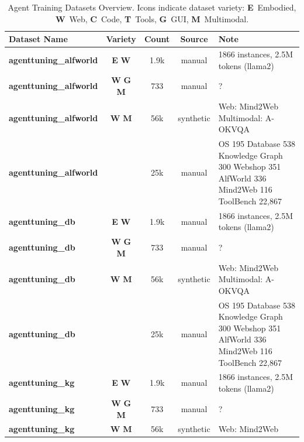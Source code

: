 \begin{table}[t]
    \caption{Agent Training Datasets Overview. Icons indicate dataset variety: \textbf{E}~Embodied, \textbf{W}~Web, \textbf{C}~Code, \textbf{T}~Tools, \textbf{G}~GUI, \textbf{M}~Multimodal.}
    \centering
    \small
    \setlength{\tabcolsep}{3pt}
    \begin{tabular*}{\textwidth}{@{\extracolsep{\fill}}l c c c p{5cm}}
        \toprule
        \textbf{Dataset Name} & \textbf{Variety} & \textbf{Count} & \textbf{Source} & \textbf{Note} \\
        \midrule
        \textbf{agenttuning\_alfworld \cite{agenttuning_enabling_2310_12823}} & \textbf{E} \textbf{W} & 1.9k & manual & 1866 instances, 2.5M tokens (llama2) \\
        \textbf{agenttuning\_alfworld \cite{webvoyager_building__2401_13919}} & \textbf{W} \textbf{G} \textbf{M} & 733 & manual & ? \\
        \textbf{agenttuning\_alfworld \cite{agent_lumos_unified__2311_05657}} & \textbf{W} \textbf{M} & 56k & synthetic & Web: Mind2Web
Multimodal: A-OKVQA \\
        \textbf{agenttuning\_alfworld \cite{agent_flan_designing_2403_12881}} &  & 25k & manual & OS 195
Database 538
Knowledge Graph 300
Webshop 351
AlfWorld 336
Mind2Web 116
ToolBench 22,867 \\
        \textbf{agenttuning\_db \cite{agenttuning_enabling_2310_12823}} & \textbf{E} \textbf{W} & 1.9k & manual & 1866 instances, 2.5M tokens (llama2) \\
        \textbf{agenttuning\_db \cite{webvoyager_building__2401_13919}} & \textbf{W} \textbf{G} \textbf{M} & 733 & manual & ? \\
        \textbf{agenttuning\_db \cite{agent_lumos_unified__2311_05657}} & \textbf{W} \textbf{M} & 56k & synthetic & Web: Mind2Web
Multimodal: A-OKVQA \\
        \textbf{agenttuning\_db \cite{agent_flan_designing_2403_12881}} &  & 25k & manual & OS 195
Database 538
Knowledge Graph 300
Webshop 351
AlfWorld 336
Mind2Web 116
ToolBench 22,867 \\
        \textbf{agenttuning\_kg \cite{agenttuning_enabling_2310_12823}} & \textbf{E} \textbf{W} & 1.9k & manual & 1866 instances, 2.5M tokens (llama2) \\
        \textbf{agenttuning\_kg \cite{webvoyager_building__2401_13919}} & \textbf{W} \textbf{G} \textbf{M} & 733 & manual & ? \\
        \textbf{agenttuning\_kg \cite{agent_lumos_unified__2311_05657}} & \textbf{W} \textbf{M} & 56k & synthetic & Web: Mind2Web

\end{tabular*}
\end{table}
